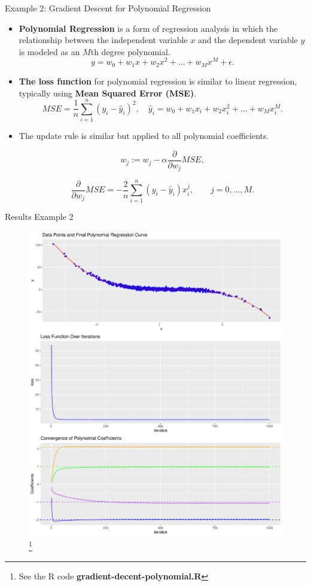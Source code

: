 \documentclass[10pt, hyperref={colorlinks = true,linkcolor = blue}]{beamer}
\begin{document}
{{\begin{frame}{Example 2: Gradient Descent for Polynomial Regression}
 \begin{itemize}[<+->]
\item \textbf{Polynomial Regression} is a form of regression analysis in which the relationship between the independent variable \(x\) and the dependent variable \(y\) is modeled as an \(M\)th degree polynomial.
\[
y = w_0 + w_1 x + w_2 x^2 + \ldots + w_M x^M + \epsilon.
\]
\item \textbf{The loss function} for polynomial regression is similar to linear regression, typically using \textbf{Mean Squared Error (MSE)}.
\[
MSE = \frac{1}{n} \sum_{i=1}^{n} (y_i - \hat{y}_i)^2, \quad 
\hat{y}_i = w_0 + w_1 x_i + w_2 x_i^2 + \ldots + w_M x_i^M.
\]
\item The update rule is similar but applied to all polynomial coefficients.

\[
w_j := w_j - \alpha \frac{\partial}{\partial w_j} MSE,
\]

\[
\frac{\partial}{\partial w_j} MSE = -\frac{2}{n} \sum_{i=1}^{n} (y_i - \hat{y}_i) x_i^j, \qquad j=0,\ldots,M.
\]
\end{itemize}
\end{frame}

\begin{frame}{Results Example 2}
\begin{figure}
\includegraphics[width=0.6\linewidth]{figures/gradient_descent_polynomial_harmonic_plots.pdf}\footnote{See the R code \textbf{gradient-decent-polynomial.R}}
\end{figure}
\end{frame}

}
}
\end{document}
